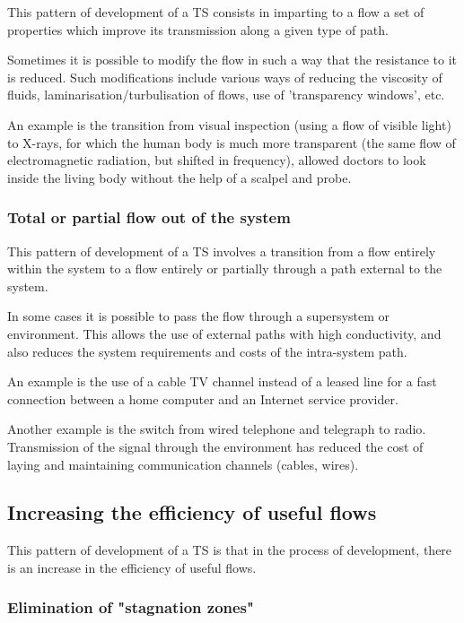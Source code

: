 \documentclass[a4paper,11pt]{article}
\begin{document}
This pattern of development of a TS consists in imparting to a flow a set of
properties which improve its transmission along a given type of path.

Sometimes it is possible to modify the flow in such a way that the resistance
to it is reduced. Such modifications include various ways of reducing the
viscosity of fluids, laminarisation/turbulisation of flows, use of
'transparency windows', etc.

An example is the transition from visual inspection (using a flow of visible
light) to X-rays, for which the human body is much more transparent (the same
flow of electromagnetic radiation, but shifted in frequency), allowed doctors
to look inside the living body without the help of a scalpel and probe.

\subsubsection{Total or partial flow out of the system}

This pattern of development of a TS involves a transition from a flow entirely
within the system to a flow entirely or partially through a path external to
the system.

In some cases it is possible to pass the flow through a supersystem or
environment. This allows the use of external paths with high conductivity, and
also reduces the system requirements and costs of the intra-system path.

An example is the use of a cable TV channel instead of a leased line for a
fast connection between a home computer and an Internet service provider.

Another example is the switch from wired telephone and telegraph to radio.
Transmission of the signal through the environment has reduced the cost of
laying and maintaining communication channels (cables, wires).

\subsection{Increasing the efficiency of useful flows}

This pattern of development of a TS is that in the process of development,
there is an increase in the efficiency of useful flows.

\subsubsection{Elimination of "stagnation zones"}
\end{document}
